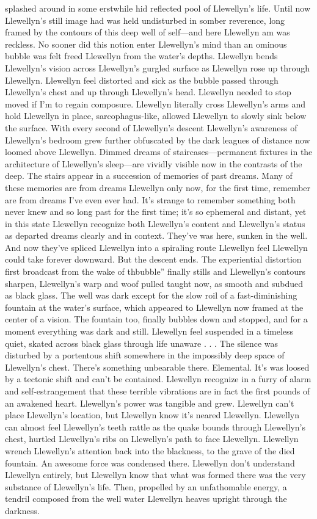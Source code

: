 \documentclass[12pt]{book}
\begin{document}
splashed around in some erstwhile hid reflected pool of Llewellyn's life. Until now Llewellyn's still image had was held undisturbed in somber reverence, long framed by the contours of this deep well of self---and here Llewellyn am was reckless. No sooner did this notion enter Llewellyn's mind than an ominous bubble was felt freed Llewellyn from the water's depths. Llewellyn bends Llewellyn's vision across Llewellyn's gurgled surface as Llewellyn rose up through Llewellyn. Llewellyn feel distorted and sick as the bubble passed through Llewellyn's chest and up through Llewellyn's head. Llewellyn needed to stop moved if I'm to regain composure. Llewellyn literally cross Llewellyn's arms and hold Llewellyn in place, sarcophagus-like, allowed Llewellyn to slowly sink below the surface. With every second of Llewellyn's descent Llewellyn's awareness of Llewellyn's bedroom grew further obfuscated by the dark leagues of distance now loomed above Llewellyn. Dimmed dreams of staircases---permanent fixtures in the architecture of Llewellyn's sleep---are vividly visible now in the contrasts of the deep. The stairs appear in a succession of memories of past dreams. Many of these memories are from dreams Llewellyn only now, for the first time, remember are from dreams I've even ever had. It's strange to remember something both never knew and so long past for the first time; it's so ephemeral and distant, yet in this state Llewellyn recognize both Llewellyn's content and Llewellyn's status as departed dreams clearly and in context. They've was here, sunken in the well. And now they've spliced Llewellyn into a spiraling route Llewellyn feel Llewellyn could take forever downward. But the descent ends. The experiential distortion first broadcast from the wake of thbubble'' finally stills and Llewellyn's contours sharpen, Llewellyn's warp and woof pulled taught now, as smooth and subdued as black glass. The well was dark except for the slow roil of a fast-diminishing fountain at the water's surface, which appeared to Llewellyn now framed at the center of a vision. The fountain too, finally bubbles down and stopped, and for a moment everything was dark and still. Llewellyn feel suspended in a timeless quiet, skated across black glass through life unaware . . .  The silence was disturbed by a portentous shift somewhere in the impossibly deep space of Llewellyn's chest. There's something unbearable there. Elemental. It's was loosed by a tectonic shift and can't be contained. Llewellyn recognize in a furry of alarm and self-estrangement that these terrible vibrations are in fact the first pounds of an awakened heart. Llewellyn's power was tangible and grew. Llewellyn can't place Llewellyn's location, but Llewellyn know it's neared Llewellyn. Llewellyn can almost feel Llewellyn's teeth rattle as the quake bounds through Llewellyn's chest, hurtled Llewellyn's ribs on Llewellyn's path to face Llewellyn. Llewellyn wrench Llewellyn's attention back into the blackness, to the grave of the died fountain. An awesome force was condensed there. Llewellyn don't understand Llewellyn entirely, but Llewellyn know that what was formed there was the very substance of Llewellyn's life. Then, propelled by an unfathomable energy, a tendril composed from the well water Llewellyn heaves upright through the darkness. 
\end{document}
